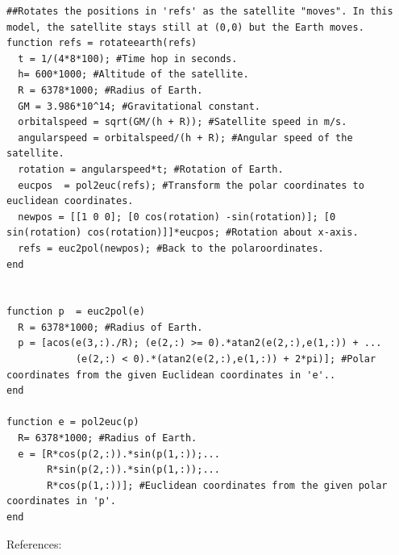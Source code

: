 \documentclass{article}
\begin{document}
\begin{verbatim}
##Rotates the positions in 'refs' as the satellite "moves". In this model, the satellite stays still at (0,0) but the Earth moves.
function refs = rotateearth(refs)
  t = 1/(4*8*100); #Time hop in seconds.
  h= 600*1000; #Altitude of the satellite.
  R = 6378*1000; #Radius of Earth.
  GM = 3.986*10^14; #Gravitational constant.
  orbitalspeed = sqrt(GM/(h + R)); #Satellite speed in m/s.
  angularspeed = orbitalspeed/(h + R); #Angular speed of the satellite.
  rotation = angularspeed*t; #Rotation of Earth.
  eucpos  = pol2euc(refs); #Transform the polar coordinates to euclidean coordinates.
  newpos = [[1 0 0]; [0 cos(rotation) -sin(rotation)]; [0 sin(rotation) cos(rotation)]]*eucpos; #Rotation about x-axis.  
  refs = euc2pol(newpos); #Back to the polaroordinates.
end


function p  = euc2pol(e)
  R = 6378*1000; #Radius of Earth.
  p = [acos(e(3,:)./R); (e(2,:) >= 0).*atan2(e(2,:),e(1,:)) + ...
			(e(2,:) < 0).*(atan2(e(2,:),e(1,:)) + 2*pi)]; #Polar coordinates from the given Euclidean coordinates in 'e'..
end

function e = pol2euc(p)
  R= 6378*1000; #Radius of Earth.
  e = [R*cos(p(2,:)).*sin(p(1,:));...
       R*sin(p(2,:)).*sin(p(1,:));...
       R*cos(p(1,:))]; #Euclidean coordinates from the given polar coordinates in 'p'.
end

\end{verbatim}
References:
\end{document}
